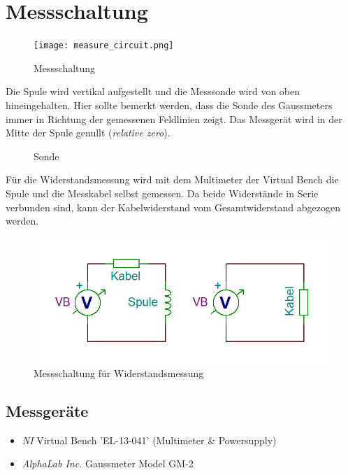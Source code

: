 \documentclass[../main.tex]{subfiles}
\begin{document}
\section{Messschaltung}

\begin{figure}[h]
  \centering
  \texttt{[image: measure\_circuit.png]}
  \caption{Messschaltung}
  \label{fig:measure_circuit}
\end{figure}

Die Spule wird vertikal aufgestellt und die Messsonde wird von oben hineingehalten. Hier sollte bemerkt werden, dass die Sonde des Gaussmeters immer in Richtung der gemessenen Feldlinien zeigt. Das Messgerät wird in der Mitte der Spule genullt (\textit{relative zero}).

\begin{figure}[h]
  \centering
  
  \caption{Sonde }
  \label{fig:measure_direction}
\end{figure}

Für die Widerstandsmessung wird mit dem Multimeter der Virtual Bench die Spule und die Messkabel selbst gemessen. Da beide Widerstände in Serie verbunden sind, kann der Kabelwiderstand vom Gesamtwiderstand abgezogen werden.

\begin{figure}[h]
  \centering
  \includegraphics[scale=0.35]{assets/measure_resistance.PNG}
  \caption{Messschaltung für Widerstandsmessung}
  \label{fig:measure_resistance}
\end{figure}

\subsection{Messgeräte}

\begin{itemize}
  \item \textit{NI} Virtual Bench 'EL-13-041' (Multimeter \& Powersupply)
  \item \textit{AlphaLab Inc.} Gaussmeter Model GM-2
\end{itemize}
\end{document}
